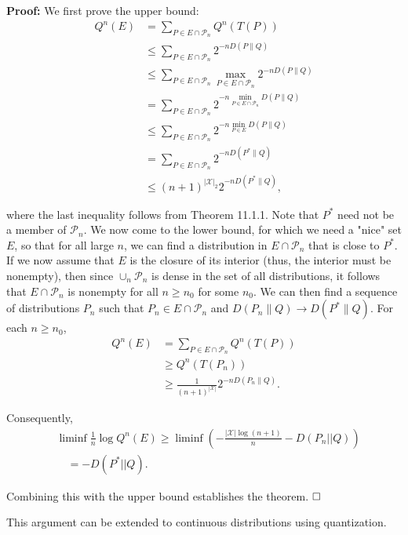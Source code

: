 \begin{Answer}
\textbf{Proof:} We first prove the upper bound:
\begin{align*}
Q^n(E) & =\sum_{P \in E \cap \mathcal{P}_n} Q^n(T(P)) \\
& \leq \sum_{P \in E \cap \mathcal{P}_n} 2^{-n D(P \| Q)}
\\
& \leq \sum_{P \in E \cap \mathcal{P}_n} \max _{P \in E \cap \mathcal{P}_n} 2^{-n D(P \| Q)} \\
& =\sum_{P \in E \cap \mathcal{P}_n} 2^{-n \min _{P \in E \cap \mathcal{P}_n} D(P \| Q)} \\
& \leq \sum_{P \in E \cap \mathcal{P}_n} 2^{-n \min _{P \in E} D(P \| Q)} \\
& =\sum_{P \in E \cap \mathcal{P}_n} 2^{-n D\left(P^* \| Q\right)} \\
& \leq(n+1)^{|\mathcal{X}|_2} 2^{-n D\left(P^* \| Q\right)},
\end{align*}

where the last inequality follows from Theorem 11.1.1. Note that $P^*$ need not be a member of $\mathcal{P}_n$. We now come to the lower bound, for which we need a "nice" set $E$, so that for all large $n$, we can find a distribution in $E \cap \mathcal{P}_n$ that is close to $P^*$. If we now assume that $E$ is the closure of its interior (thus, the interior must be nonempty), then since $\cup_n \mathcal{P}_n$ is dense in the set of all distributions, it follows that $E \cap \mathcal{P}_n$ is nonempty for all $n \geq n_0$ for some $n_0$. We can then find a sequence of distributions $P_n$ such that $P_n \in E \cap \mathcal{P}_n$ and $D\left(P_n \| Q\right) \rightarrow D\left(P^* \| Q\right)$. For each $n \geq n_0$,
$$
\begin{aligned}
Q^n(E) & =\sum_{P \in E \cap \mathcal{P}_n} Q^n(T(P)) \\
& \geq Q^n\left(T\left(P_n\right)\right) \\
& \geq \frac{1}{(n+1)^{|\mathcal{X}|}} 2^{-n D\left(P_n \| Q\right)} .
\end{aligned}
$$

Consequently,
$$
\begin{aligned}
& \liminf \frac{1}{n} \log Q^n(E) \geq \liminf \left(-\frac{|\mathcal{X}| \log (n+1)}{n}-D\left(P_n|| Q\right)\right) \\
& \quad=-D\left(P^*|| Q\right) .
\end{aligned}
$$

Combining this with the upper bound establishes the theorem.
$\hfill\square$
\end{Answer}
This argument can be extended to continuous distributions using quantization.

